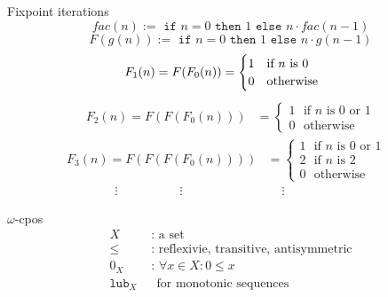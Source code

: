 \documentclass{beamer}
\begin{document}

\begin{frame}{Fixpoint iterations}
  $$\textit{fac}(n) := \texttt{ if } n = 0 \texttt{ then }1\texttt{ else } n\cdot
  \textit{fac}(n-1)$$
  \pause
  $$F(g(n)):=\texttt{ if }n=0\texttt{ then }1\texttt{ else }n\cdot g(n-1)$$
  \pause
  \begin{align*}
    \hspace{0.6em}
    F_1(n) = F(F_0(n)) & = \begin{cases}
      1~~~\text{if }n\text{ is 0}\\
      0~~~\text{otherwise}
    \end{cases}
  \end{align*}
  \pause
  \vspace{-1em}
  \begin{align*}
    F_2(n) = F(F(F_0(n))) & = \begin{cases}
      1~~~\text{if }n\text{ is 0 or 1}\\
      0~~~\text{otherwise}
    \end{cases}
  \end{align*}
  \pause
  \vspace{-1em}
  \begin{align*}
    F_3(n) = F(F(F(F_0(n)))) & = \begin{cases}
      1~~~\text{if }n\text{ is 0 or 1}\\
      2~~~\text{if }n\text{ is 2}\\
      0~~~\text{otherwise}\hspace{2em}
    \end{cases}
  \end{align*}
  \pause
  \vspace{-1em}
  \begin{align*}
    \vdots \hspace{5em} \vdots \hspace{5em} \hspace{3em}\vdots\hspace{5em}
  \end{align*}
\end{frame}


\begin{frame}{$\omega$-cpos}
  \begin{align*}
    X & \text{ : a set}\\
    \leq & \text{ : reflexivie, transitive, antisymmetric}\\
    0_X &\text{ : } \forall x \in X : 0 \leq x\\
    \texttt{lub}_X &~~\text{ for monotonic sequences}\\
  \end{align*}
\end{frame}
\end{document}
